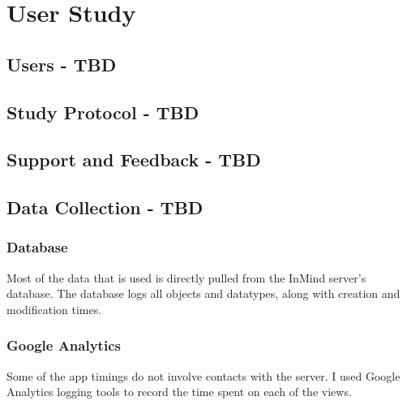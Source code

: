 \chapter{User Study}
\section{Users - TBD}
\section{Study Protocol - TBD}
\section{Support and Feedback - TBD}
\section{Data Collection - TBD}
  \subsection{Database}
    Most of the data that is used is directly pulled from the InMind server's database.
    The database logs all objects and datatypes,
    along with creation and modification times.

  \subsection{Google Analytics}
    Some of the app timings do not involve contacts with the server.
    I used Google Analytics logging tools to record the time spent on each of the views.
